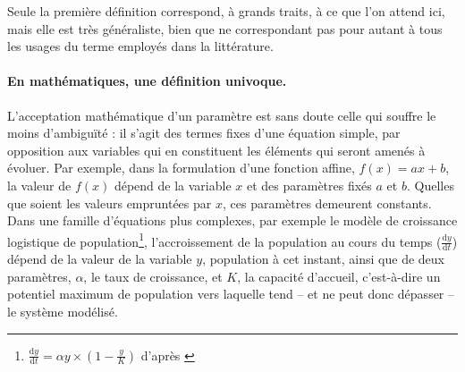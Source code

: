 Seule la première définition correspond, à grands traits, à ce que l'on attend ici, mais elle est très généraliste, bien que ne correspondant pas pour autant à tous les usages du terme employés dans la littérature.

\paragraph{En mathématiques, une définition univoque.}

L'acceptation mathématique d'un paramètre est sans doute celle qui souffre le moins d'ambiguïté : il s'agit des termes fixes d'une équation simple, par opposition aux variables qui en constituent les éléments qui seront amenés à évoluer.
Par exemple, dans la formulation d'une fonction affine, $f(x) = ax + b$, la valeur de $f(x)$ dépend de la variable $x$ et des paramètres fixés $a$ et $b$.
Quelles que soient les valeurs empruntées par $x$, ces paramètres demeurent constants.
Dans une famille d'équations plus complexes, par exemple le modèle de croissance logistique de population\footnote{
	$\frac{\text{d}y}{\text{d}t} = \alpha y \times (1 - \frac{y}{K})$ d'après \autocite{verhulst1838notice}
}, l'accroissement de la population au cours du temps ($\frac{\text{d}y}{\text{d}t}$) dépend de la valeur de la variable $y$, population à cet instant, ainsi que de deux paramètres, $\alpha$, le taux de croissance, et $K$, la \og capacité d'accueil\fg{}, c'est-à-dire un potentiel maximum de population vers laquelle tend -- et ne peut donc dépasser -- le système modélisé.

